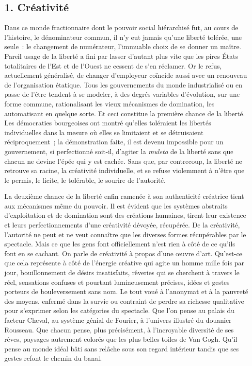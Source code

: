 \documentclass[french,twoside]{book} %
\begin{document}
\subsection[{1. Créativité}]{\textsc{1.} Créativité}
\noindent Dans ce monde fractionnaire dont le pouvoir social hiérarchisé fut, au cours de l’histoire, le dénominateur commun, il n’y eut jamais qu’une liberté tolérée, une seule : le changement de numérateur, l’immuable choix de se donner un maître. Pareil usage de la liberté a fini par lasser d’autant plus vite que les pires États totalitaires de l’Est et de l’Ouest ne cessent de s’en réclamer. Or le refus, actuellement généralisé, de changer d’employeur coïncide aussi avec un renouveau de l’organisation étatique. Tous les gouvernements du monde industrialisé ou en passe de l’être tendent à se modeler, à des degrés variables d’évolution, sur une forme commune, rationalisant les vieux mécanismes de domination, les automatisant en quelque sorte. Et ceci constitue la première chance de la liberté. Les démocraties bourgeoises ont montré qu’elles toléraient les libertés individuelles dans la mesure où elles se limitaient et se détruisaient réciproquement ; la démonstration faite, il est devenu impossible pour un gouvernement, si perfectionné soit-il, d’agiter la \emph{muleta} de la liberté sans que chacun ne devine l’épée qui y est cachée. Sans que, par contrecoup, la liberté ne retrouve sa racine, la créativité individuelle, et se refuse violemment à n’être que le permis, le licite, le tolérable, le sourire de l’autorité.\par
La deuxième chance de la liberté enfin ramenée à son authenticité créatrice tient aux mécanismes même du pouvoir. Il est évident que les systèmes abstraits d’exploitation et de domination sont des créations humaines, tirent leur existence et leurs perfectionnements d’une créativité dévoyée, récupérée. De la créativité, l’autorité ne peut et ne veut connaître que les diverses formes récupérables par le spectacle. Mais ce que les gens font officiellement n’est rien à côté de ce qu’ils font en se cachant. On parle de créativité à propos d’une œuvre d’art. Qu’est-ce que cela représente à côté de l’énergie créative qui agite un homme mille fois par jour, bouillonnement de désirs insatisfaits, rêveries qui se cherchent à travers le réel, sensations confuses et pourtant lumineusement précises, idées et gestes porteurs de bouleversement sans nom. Le tout voué à l’anonymat et à la pauvreté des moyens, enfermé dans la survie ou contraint de perdre sa richesse qualitative pour s’exprimer selon les catégories du spectacle. Que l’on pense au palais du facteur Cheval, au système génial de Fourier, à l’univers illustré du douanier Rousseau. Que chacun pense, plus précisément, à l’incroyable diversité de ses rêves, paysages autrement colorés que les plus belles toiles de Van Gogh. Qu’il pense au monde idéal bâti sans relâche sous son regard intérieur tandis que ses gestes refont le chemin du banal.\par
\end{document}
